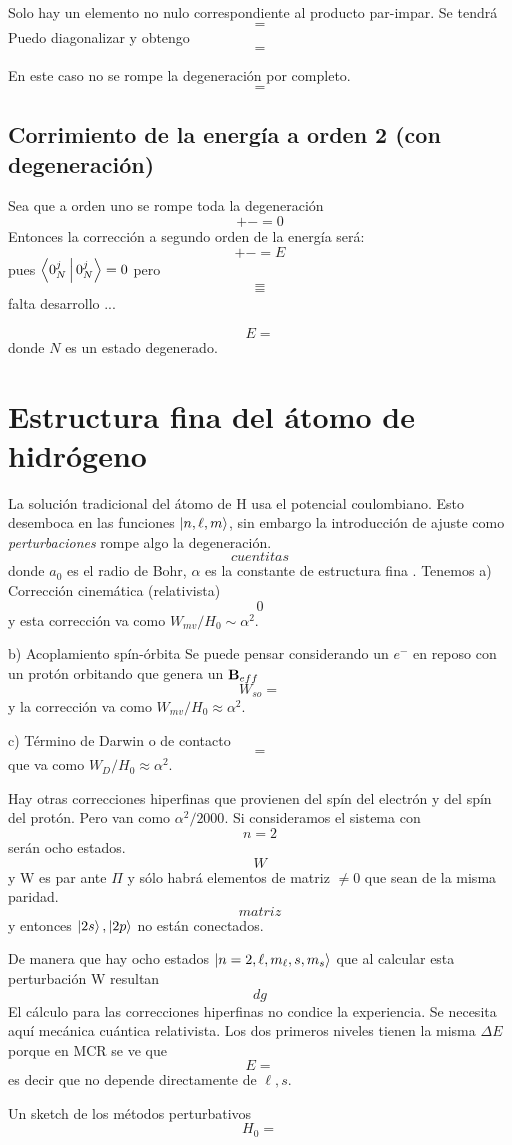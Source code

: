 \documentclass[10pt,oneside]{CBFT_book}
\begin{document}
Solo hay un elemento no nulo correspondiente al producto par-impar.
Se tendrá 
\[
	=
\]
Puedo diagonalizar y obtengo 
\[
	=
\]

En este caso no se rompe la degeneración por completo.
\[
	=
\]


\subsection{Corrimiento de la energía a orden 2 (con degeneración)}

Sea que a orden uno se rompe toda la degeneración 
\[
	+ - = 0
\]
Entonces la corrección a segundo orden de la energía será:
\[
	+ - = E
\]
pues $\Braket{0_N^j|0_N^j}= 0$ pero 
\[
	=
\]
\[
	=
\]
falta desarrollo ...

\[
	E =
\]
donde $N$ es un estado degenerado.

\section{Estructura fina del átomo de hidrógeno}

La solución tradicional del átomo de H usa el potencial coulombiano. Esto desemboca en las funciones 
$\Ket{n,\ell,m}$, sin embargo la introducción de ajuste como {\it perturbaciones} rompe algo la degeneración.
\[
	cuentitas
\]
donde $a_0$ es el radio de Bohr, $\alpha$ es la constante de estructura fina .
Tenemos 
a) Corrección cinemática (relativista)
\[	
	0
\]
y esta corrección va como $W_{mv}/H_0 \sim \alpha^2$.

b) Acoplamiento spín-órbita
Se puede pensar considerando un $e^-$ en reposo con un protón orbitando que genera un $\vb{B}_{eff}$
\[
	W_{so} =
\]
y la corrección va como $W_{mv}/H_0 \approx \alpha^2$.

c) Término de Darwin o de contacto
\[
	=
\]
que va como  $W_{D}/H_0 \approx \alpha^2$.

Hay otras correcciones hiperfinas que provienen del spín del electrón y del spín del protón. Pero van como 
$\alpha^2/2000$.
Si consideramos el sistema con 
\[
	n=2
\]
serán ocho estados.
\[
	W
\]
y W es par ante $\Pi$ y sólo habrá elementos de matriz $\neq 0$ que sean de la misma paridad.
\[
	matriz
\]
y entonces $\Ket{2s}, \Ket{2p}$ no están conectados.

De manera que hay ocho estados $\Ket{n=2,\ell,m_\ell,s,m_s}$ que al calcular esta perturbación W resultan 
\[
	dg
\]
El cálculo para las correcciones hiperfinas no condice la experiencia. Se necesita aquí mecánica cuántica 
relativista. Los dos primeros niveles tienen la misma $\Delta E$ porque en MCR se ve que 
\[
	E = 
\]
es decir que no depende directamente de $\ell,s$.

Un sketch de los métodos perturbativos
\[
	H_0 = 
\]






\end{document}
